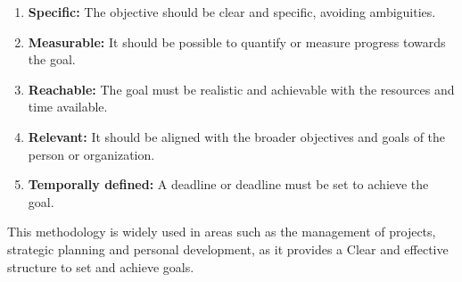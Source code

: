 \documentclass{article}
\begin{document}
\begin{enumerate}
	\item
	      \textbf{Specific:}
	      The objective should be clear and specific, avoiding ambiguities.
	\item
	      \textbf{Measurable:}
	      It should be possible to quantify or measure progress towards the goal.
	\item
	      \textbf{Reachable:}
	      The goal must be realistic and achievable with the resources and time
	      available.
	\item
	      \textbf{Relevant:}
	      It should be aligned with the broader objectives and goals of the
	      person or organization.
	\item
	      \textbf{Temporally defined:}
	      A deadline or deadline must be set to achieve the goal.
\end{enumerate}

\par This methodology is widely used in areas such as the management of
projects, strategic planning and personal development, as it provides a Clear
and effective structure to set and achieve goals.
\end{document}
